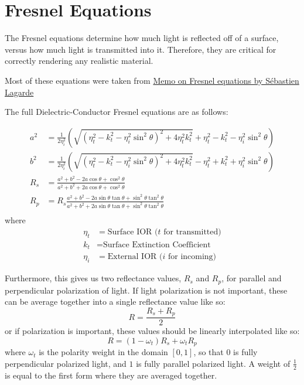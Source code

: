 \documentclass[12pt,letterpaper]{article}
\begin{document}
\newpage

\section{Fresnel Equations}

The Fresnel equations determine how much light is reflected off of a surface, versus how much light is transmitted into it. Therefore,
they are critical for correctly rendering any realistic material.

\noindent Most of these equations were taken from 
{\color{blue}\href{https://seblagarde.wordpress.com/2013/04/29/memo-on-fresnel-equations/}{Memo on Fresnel equations by Sébastien Lagarde}}

The full Dielectric-Conductor Fresnel equations are as follows:

\begin{align*}
    a^2 &= \frac{1}{2\eta_i^2}\left(\sqrt{{\left(\eta_t^2 - k_t^2 - \eta_i^2 \sin^2\theta\right)}^2 + 4\eta_t^2 k_t^2} + \eta_t^2 - k_t^2 - \eta_i^2 \sin^2\theta\right)\\
    b^2 &= \frac{1}{2\eta_i^2}\left(\sqrt{{\left(\eta_t^2 - k_t^2 - \eta_i^2 \sin^2\theta\right)}^2 + 4\eta_t^2 k_t^2} - \eta_t^2 + k_t^2 + \eta_i^2 \sin^2\theta\right)\\
    R_s &= \frac{a^2 + b^2 - 2a \cos\theta + \cos^2\theta }{a^2 + b^2 + 2a \cos\theta + \cos^2\theta}\\
    R_p &= R_s \frac{a^2 + b^2 - 2a \sin\theta \tan\theta + \sin^2\theta \tan^2\theta}{a^2+b^2+2 a\sin\theta \tan\theta + \sin^2\theta \tan^2\theta}\\
\end{align*}
where
\begin{align*}
    \eta_t &= \text{Surface IOR ($t$ for transmitted)}\\
    k_t    &= \text{Surface Extinction Coefficient}\\
    \eta_i &= \text{External IOR ($i$ for incoming)}
\end{align*}

Furthermore, this gives us two reflectance values, $R_s$ and $R_p$, for parallel and perpendicular polarization of light.
If light polarization is not important, these can be average together into a single reflectance value like so:
$$
R = \frac{R_s + R_p}{2}
$$
or if polarization is important, these values should be linearly interpolated like so:
$$
R = \left(1 - \omega_t\right) R_s + \omega_t R_p
$$
where $\omega_t$ is the polarity weight in the domain $\left[0,1\right]$, so that $0$ is fully perpendicular polarized light, 
and $1$ is fully parallel polarized light. A weight of $\frac{1}{2}$ is equal to the first form 
where they are averaged together.
\end{document}
